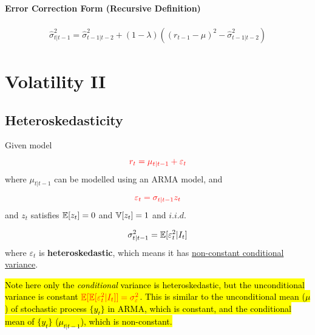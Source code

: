 \documentclass[11pt]{article}
\begin{document}
			\paragraph{Error Correction Form (Recursive Definition)}
				\begin{gather}
					\hat{\sigma}_{t|t-1}^2 = \hat{\sigma}_{t-1|t-2}^2 + (1 - \lambda) ((r_{t-1} - \mu)^2 - \hat{\sigma}_{t-1|t-2}^2)
				\end{gather}

				
	
	\section{Volatility II}
	    \subsection{Heteroskedasticity}
	        \begin{definition}
	            Given model
	            \begin{equation}
	                \textcolor{red}{r_t = \mu_{t|t-1} + \varepsilon_t}
	            \end{equation}
	            where $\mu_{t|t-1}$ can be modelled using an ARMA model, and 
	            \begin{equation}
	                \textcolor{red}{\varepsilon_t = \sigma_{t|t-1} z_t}
	            \end{equation}
	            and $z_t$ satisfies $\mathbb{E}[{z_t}] = 0$ and $\mathbb{V}[{z_t}] = 1$ and $i.i.d.$
	        \end{definition}
	        
	        \begin{remark}
	            \begin{equation}
	                \sigma_{t|t-1}^2 = \mathbb{E}[{\varepsilon_t^2|I_t}]
	            \end{equation}
	            where $\varepsilon_t$ is \textbf{heteroskedastic}, which means it has \ul{non-constant conditional variance}.
	        \end{remark}
	        
	        \begin{remark}
	            \hl{Note here only the \emph{conditional} variance is heteroskedastic, but the unconditional variance is constant $\textcolor{red}{\mathbb{E}[{\mathbb{E}[{\varepsilon_t^2|I_t}]}] = \sigma_\varepsilon^2}$. This is similar to the unconditional mean ($\mu$) of stochastic process $\{y_t\}$ in ARMA, which is constant, and the conditional mean of $\{y_t\}$ ($\mu_{t|t-1}$), which is non-constant.}
	        \end{remark}
\end{document}
